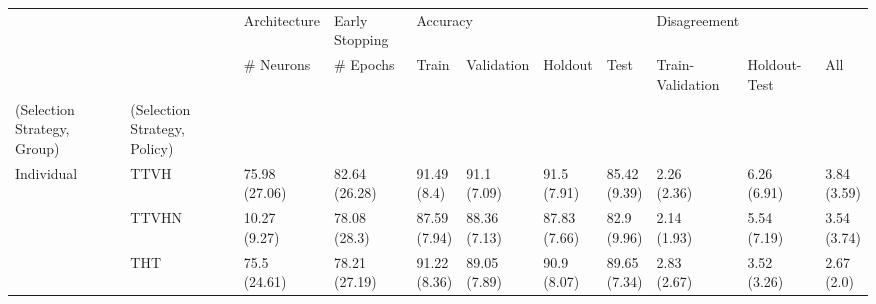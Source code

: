 \begin{table}
\centering
\label{tab:low_complexity}
\begin{tabular}{lllllllllll}
\toprule
       &        &   Architecture & Early Stopping & \multicolumn{4}{l}{Accuracy} & \multicolumn{3}{l}{Disagreement} \\
       &        &      \# Neurons &       \# Epochs &          Train &    Validation &       Holdout &           Test & Train-Validation & Holdout-Test &          All \\
(Selection Strategy, Group) & (Selection Strategy, Policy) &                &                &                &               &               &                &                  &              &              \\
\midrule
Individual & TTVH &  \makecell{75.98\\(27.06)} &  \makecell{82.64\\(26.28)} &    \makecell{91.49\\(8.4)} &   \makecell{91.1\\(7.09)} &   \makecell{91.5\\(7.91)} &   \makecell{85.42\\(9.39)} &      \makecell{2.26\\(2.36)} &  \makecell{6.26\\(6.91)} &  \makecell{3.84\\(3.59)} \\
       & TTVHN &   \makecell{10.27\\(9.27)} &   \makecell{78.08\\(28.3)} &   \makecell{87.59\\(7.94)} &  \makecell{88.36\\(7.13)} &  \makecell{87.83\\(7.66)} &    \makecell{82.9\\(9.96)} &      \makecell{2.14\\(1.93)} &  \makecell{5.54\\(7.19)} &  \makecell{3.54\\(3.74)} \\
       & THT &   \makecell{75.5\\(24.61)} &  \makecell{78.21\\(27.19)} &   \makecell{91.22\\(8.36)} &  \makecell{89.05\\(7.89)} &   \makecell{90.9\\(8.07)} &   \makecell{89.65\\(7.34)} &      \makecell{2.83\\(2.67)} &  \makecell{3.52\\(3.26)} &   \makecell{2.67\\(2.0)} \\

\end{tabular}
\end{table}
